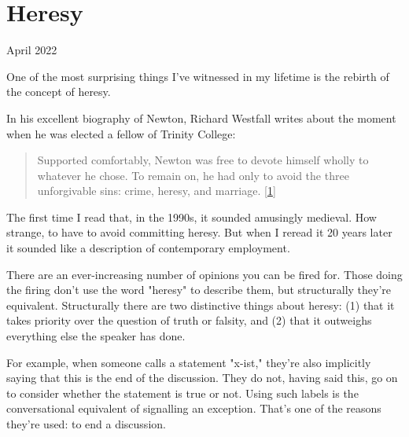 \chapter{Heresy}


            
              
                

April 2022

One of the most surprising things I've
                  witnessed in my lifetime is the rebirth of the concept of
                  heresy.

In his excellent biography of Newton,
                  Richard Westfall writes about the moment when he was elected a
                  fellow of Trinity College:
                  \begin{quote}

                    Supported comfortably, Newton was free to devote himself
                    wholly to whatever he chose. To remain on, he had only to
                    avoid the three unforgivable sins: crime, heresy, and
                    marriage.
                    [\href{\#f1n}{1}]
                  
\end{quote}

                  The first time I read that, in the 1990s, it sounded amusingly
                  medieval. How strange, to have to avoid committing heresy. But
                  when I reread it 20 years later it sounded like a description
                  of contemporary employment.

There are an
                  ever-increasing number of opinions you can be fired for. Those
                  doing the firing don't use the word "heresy" to describe them,
                  but structurally they're equivalent. Structurally there are
                  two distinctive things about heresy: (1) that it takes
                  priority over the question of truth or falsity, and (2) that
                  it outweighs everything else the speaker has done.

For
                  example, when someone calls a statement "x-ist," they're also
                  implicitly saying that this is the end of the discussion. They
                  do not, having said this, go on to consider whether the
                  statement is true or not. Using such labels is the
                  conversational equivalent of signalling an exception. That's
                  one of the reasons they're used: to end a discussion.

